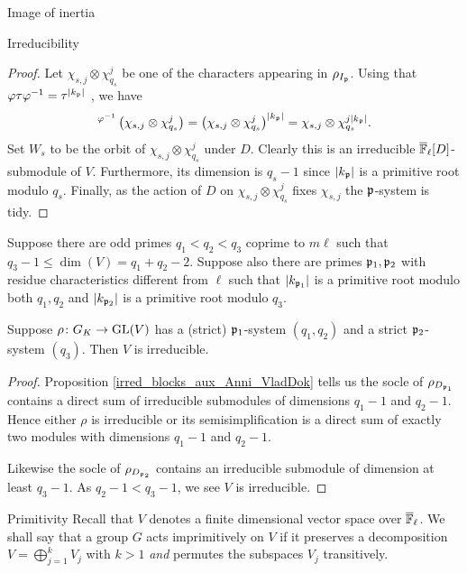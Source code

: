 \documentclass[11pt,a4paper]{article}
\begin{document}
\begin{section}{Image of inertia}
\begin{subsection}{Irreducibility}
\begin{proof}
Let $\chi_{s,j} \otimes \chi_{q_s}^j$ be one of the characters appearing in $\rho_{I_{\mathfrak{p}}}$.
Using that $\varphi \tau \varphi^{-1} = \tau ^{|k_{\mathfrak{p}}|}$ \cite[7.5.3]{Neukirch_cohom_of_number_fields}, we have
$$^{\varphi^{-1} }\left(\chi_{s,j} \otimes \chi_{q_s}^j\right) = \left(\chi_{s,j} \otimes \chi_{q_s}^j\right)^{|k_{\mathfrak{p}}|} = \chi_{s,j} \otimes \chi_{q_s}^{j|k_{\mathfrak{p}}|} .$$
Set $W_s$ to be the orbit of $\chi_{s,j} \otimes \chi_{q_s}^j$ under $D$. Clearly this is an irreducible ${\overline{\mathbb{F}}_\ell}[D]$-submodule of $V$. Furthermore, its dimension is $q_s-1$ since $|k_{\mathfrak{p}}|$ is a primitive root modulo $q_s$. 
Finally, as the action of $D$ on $\chi_{s,j} \otimes \chi_{q_s}^j$ fixes $\chi_{s,j}$ the $\mathfrak{p}$-system is tidy.
\end{proof}

\begin{proposition}
\label{prop_irreducibility}
Suppose there are odd primes $q_1<q_2<q_3$ coprime to $m\ell$ such that $q_3-1 \leq \dim(V) = q_1+q_2 - 2$.
Suppose also there are primes $\mathfrak{p}_1,\mathfrak{p}_2$ with residue characteristics different from $\ell$ such that $|k_{\mathfrak{p}_1}|$ is a primitive root modulo both $q_1,q_2$ and $|k_{\mathfrak{p}_2}|$ is a primitive root modulo $q_3$.

Suppose $\rho\colon \GK \rightarrow \GL(V)$ has a (strict) $\mathfrak{p}_1$-system $(q_1,q_2)$ and a strict $\mathfrak{p}_2$-system $(q_3)$.
Then $V$ is irreducible.
\end{proposition}

\begin{proof}
Proposition \ref{irred_blocks_aux_Anni_VladDok} tells us the socle of $\rho_{D_{\mathfrak{p}_1}}$ contains a direct sum of irreducible submodules of dimensions $q_1-1$ and $q_2-1$. Hence either $\rho$ is irreducible or its semisimplification is a direct sum of exactly two modules with dimensions $q_1-1$ and $q_2-1$.

Likewise the socle of $\rho_{D_{\mathfrak{p}_2}}$ contains an irreducible submodule of dimension at least $q_3-1$. As $q_2-1 < q_3-1$,  we see $V$ is irreducible.
\end{proof}

\end{subsection}

\begin{subsection}{Primitivity}
\label{subsection_primitivity}
Recall that $V$ denotes a finite dimensional vector space over ${\overline{\mathbb{F}}_\ell}$. 
We shall say that a group $G$ acts imprimitively on $V$ if it preserves a decomposition $V= \bigoplus^k_{j=1} V_j$ with $k>1$ \emph{and} permutes the subspaces $V_j$ transitively.


\end{subsection}
\end{section}
\end{document}
